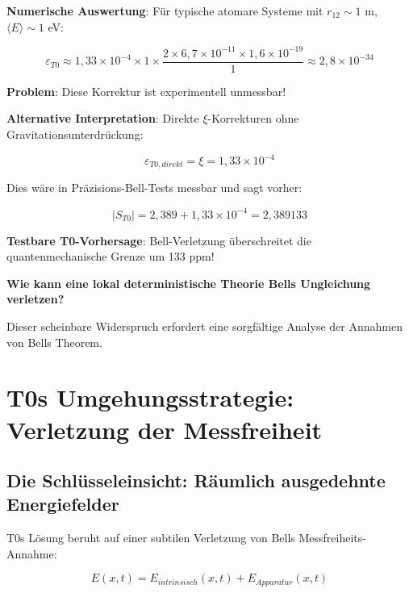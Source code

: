 \documentclass[12pt,a4paper]{article}
\newcommand{\Efield}{E}
\newcommand{\xipar}{\xi}
\begin{document}
	\textbf{Numerische Auswertung}: Für typische atomare Systeme mit $r_{12} \sim 1$ m, $\langle E \rangle \sim 1$ eV:
	
	\begin{equation}
		\varepsilon_{T0} \approx 1,33 \times 10^{-4} \times 1 \times \frac{2 \times 6,7 \times 10^{-11} \times 1,6 \times 10^{-19}}{1} \approx 2,8 \times 10^{-34}
	\end{equation}
	
	\textbf{Problem}: Diese Korrektur ist experimentell unmessbar!
	
	\textbf{Alternative Interpretation}: Direkte $\xipar$-Korrekturen ohne Gravitationsunterdrückung:
	
	\begin{equation}
		\varepsilon_{T0,direkt} = \xipar = 1,33 \times 10^{-4}
	\end{equation}
	
	Dies wäre in Präzisions-Bell-Tests messbar und sagt vorher:
	
	\begin{equation}
		|S_{T0}| = 2,389 + 1,33 \times 10^{-4} = 2,389133
	\end{equation}
	
	\textbf{Testbare T0-Vorhersage}: Bell-Verletzung überschreitet die quantenmechanische Grenze um 133 ppm!
	
	\begin{tcolorbox}[colback=yellow!5!white,colframe=orange!75!black,title=Kritische Frage]
		\textbf{Wie kann eine lokal deterministische Theorie Bells Ungleichung verletzen?}
		
		Dieser scheinbare Widerspruch erfordert eine sorgfältige Analyse der Annahmen von Bells Theorem.
	\end{tcolorbox}
	
	\section{T0s Umgehungsstrategie: Verletzung der Messfreiheit}
	
	\subsection{Die Schlüsseleinsicht: Räumlich ausgedehnte Energiefelder}
	
	T0s Lösung beruht auf einer subtilen Verletzung von Bells Messfreiheits-Annahme:
	
	\begin{equation}
		\Efield(x,t) = \Efield_{intrinsisch}(x,t) + \Efield_{Apparatur}(x,t)
	\end{equation}
	
\end{document}
